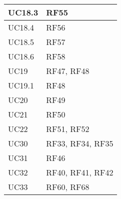 \begin{center}
\begin{longtable}{|C{5cm}|C{5cm}|}
    \hline
    UC18.3 & RF55 \\
    \hline
    UC18.4 & RF56 \\
    \hline
    UC18.5 & RF57 \\
    \hline
    UC18.6 & RF58 \\
    \hline
    UC19 & RF47, RF48 \\
    \hline
    UC19.1 & RF48 \\
    \hline
    UC20 & RF49 \\
    \hline
    UC21 & RF50 \\
    \hline
    UC22 & RF51, RF52 \\
    \hline
    UC30 & RF33, RF34, RF35 \\
    \hline
    UC31 & RF46 \\
    \hline
    UC32 & RF40, RF41, RF42 \\
    \hline
    UC33 & RF60, RF68 \\
    \hline
\end{longtable}
\end{center}
